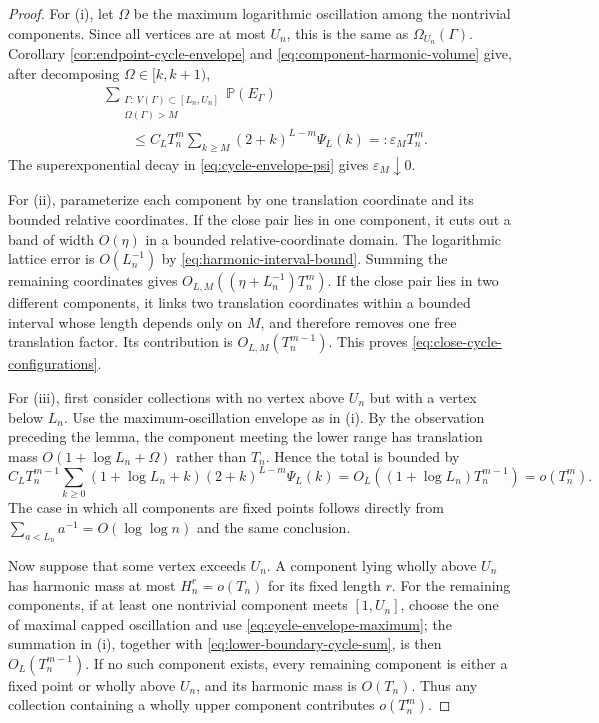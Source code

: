 \documentclass[11pt]{article}
\theoremstyle{remark}
\newcommand{\Pp}{\mathbb P}
\begin{document}
\begin{proof}
For (i), let $\Omega$ be the maximum logarithmic oscillation among the
nontrivial components.  Since all vertices are at most $U_n$, this is the same
as $\Omega_{U_n}(\Gamma)$.  Corollary
\ref{cor:endpoint-cycle-envelope} and
\eqref{eq:component-harmonic-volume} give, after decomposing
$\Omega\in[k,k+1)$,
\[
\begin{aligned}
&\sum_{\substack{\Gamma:\ V(\Gamma)\subset[L_n,U_n]\\
                  \Omega(\Gamma)>M}}
\Pp(E_\Gamma)\\
&\qquad\le C_LT_n^m
\sum_{k\ge M}(2+k)^{L-m}\Psi_L(k)
=:\varepsilon_MT_n^m.
\end{aligned}
\]
The superexponential decay in \eqref{eq:cycle-envelope-psi} gives
$\varepsilon_M\downarrow0$.

For (ii), parameterize each component by one translation coordinate and its
bounded relative coordinates.  If the close pair lies in one component, it
cuts out a band of width $O(\eta)$ in a bounded relative-coordinate domain.
The logarithmic lattice error is $O(L_n^{-1})$ by
\eqref{eq:harmonic-interval-bound}.  Summing the remaining coordinates gives
$O_{L,M}((\eta+L_n^{-1})T_n^m)$.  If the close pair lies in two different
components, it links two translation coordinates within a bounded interval
whose length depends only on $M$, and therefore removes one free translation
factor.  Its contribution is $O_{L,M}(T_n^{m-1})$.  This proves
\eqref{eq:close-cycle-configurations}.

For (iii), first consider collections with no vertex above $U_n$ but with a
vertex below $L_n$.  Use the maximum-oscillation envelope as in (i).  By the
observation preceding the lemma, the component meeting the lower range has
translation mass $O(1+\log L_n+\Omega)$ rather than $T_n$.  Hence the total is
bounded by
\[
        C_LT_n^{m-1}
        \sum_{k\ge0}(1+\log L_n+k)(2+k)^{L-m}\Psi_L(k)
        =O_L((1+\log L_n)T_n^{m-1})
        =o(T_n^m).
\tag{10.55}\label{eq:lower-boundary-cycle-sum}
\]
The case in which all components are fixed points follows directly from
$\sum_{a<L_n}a^{-1}=O(\log\log n)$ and the same conclusion.

Now suppose that some vertex exceeds $U_n$.  A component lying wholly above
$U_n$ has harmonic mass at most $H_n^r=o(T_n)$ for its fixed length $r$.
For the remaining components, if at least one nontrivial component meets
$[1,U_n]$, choose the one of maximal capped oscillation and use
\eqref{eq:cycle-envelope-maximum}; the summation in (i), together with
\eqref{eq:lower-boundary-cycle-sum}, is then $O_L(T_n^{m-1})$.  If no such
component exists, every remaining component is either a fixed point or wholly
above $U_n$, and its harmonic mass is $O(T_n)$.  Thus any collection
containing a wholly upper component contributes $o(T_n^m)$.


\end{proof}
\end{document}
